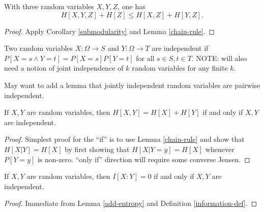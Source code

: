 \begin{corollary}\label{alt-submodularity} With three random variables $X,Y,Z$, one has
  $$ H[X,Y,Z] + H[Z] \leq H[X,Z] + H[Y,Z].$$
\end{corollary}

\begin{proof}   Apply Corollary \ref{submodularity} and Lemma \ref{chain-rule}.
\end{proof}

\begin{definition}\label{independent-def}
Two random variables $X: \Omega \to S$ and $Y: \Omega \to T$ are independent if $P[ X = s \wedge Y = t] = P[X=s] P[Y=t]$ for all $s \in S, t \in T$.  NOTE: will also need a notion of joint independence of $k$ random variables for any finite $k$.
\end{definition}

May want to add a lemma that jointly independent random variables are pairwise independent.

\begin{lemma}\label{add-entropy}  If $X,Y$ are random variables, then $H[X,Y] = H[X] + H[Y]$ if and only if $X,Y$ are independent.
\end{lemma}

\begin{proof}  Simplest proof for the ``if'' is to use Lemma \ref{chain-rule} and show that $H[X|Y] = H[X]$ by first showing that $H[X|Y=y] = H[X]$ whenever $P[Y=y]$ is non-zero.  ``only if'' direction will require some converse Jensen.
\end{proof}


\begin{corollary}\label{vanish-entropy}  If $X,Y$ are random variables, then $I[X:Y] = 0$ if and only if $X,Y$ are independent.
\end{corollary}

\begin{proof}  Immediate from Lemma \ref{add-entropy} and Definition \ref{information-def}.
\end{proof}

\begin{definition}[Conditional mutual information]\label{conditional-mutual-def}\uses{information-def,{condition-event-def}  If $X,Y,Z$ are random variables, with $Z$ $U$-valued, then
  $$ I[X:Y|Z] := \sum_{z \in U} P[Z=z] I[(X|Z=z): (Y|Z=z)].$$
\end{definition}

